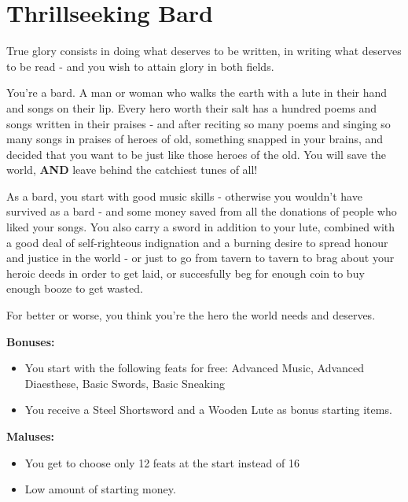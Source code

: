 \section{Thrillseeking Bard}
True glory consists in doing what deserves to be written, in writing what deserves to be read - and you wish to attain glory in both fields.

You're a bard. A man or woman who walks the earth with a lute in their hand and songs on their lip. Every hero worth their salt has a hundred poems and songs written in their praises - and after reciting so many poems and singing so many songs in praises of heroes of old, something snapped in your brains, and decided that you want to be just like those heroes of the old. You will save the world, \textbf{AND} leave behind the catchiest tunes of all!

As a bard, you start with good music skills - otherwise you wouldn't have survived as a bard - and some money saved from all the donations of people who liked your songs. You also carry a sword in addition to your lute, combined with a good deal of self-righteous indignation and a burning desire to spread honour and justice in the world - or just to go from tavern to tavern to brag about your heroic deeds  in order to get laid, or succesfully beg for enough coin to buy enough booze to get wasted.

For better or worse, you think you're the hero the world needs and deserves.

\textbf{Bonuses:}
\begin{itemize}
	\item You start with the following feats for free: Advanced Music, Advanced Diaesthese, Basic Swords, Basic Sneaking
	\item You receive a Steel Shortsword and a Wooden Lute as bonus starting items.
\end{itemize}
\textbf{Maluses:}
\begin{itemize}
	\item You get to choose only 12 feats at the start instead of 16
	\item Low amount of starting money.
\end{itemize}
